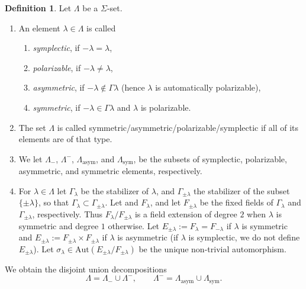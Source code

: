 \documentclass{article}
\def\tx#1{\textrm{#1}}
\theoremstyle{definition}
\newtheorem{dfn}[thm]{Definition}
\numberwithin{equation}{subsection}
\renewcommand{\-}{\hyp{}}
\begin{document}
\begin{dfn} \label{dfn:lambda_basic}
	Let $\Lambda$ be a $\Sigma$-set. 
	\begin{enumerate}
		\item An element $\lambda \in \Lambda$ is called
		\begin{enumerate}
			\item \emph{symplectic}, if $-\lambda=\lambda$,
			\item \emph{polarizable}, if $-\lambda \neq \lambda$,
			\item \emph{asymmetric}, if $-\lambda \notin \Gamma\lambda$ (hence $\lambda$ is automatically polarizable),
			\item \emph{symmetric}, if $-\lambda \in \Gamma\lambda$ and $\lambda$ is polarizable.			
		\end{enumerate}
		\item The set $\Lambda$ is called symmetric/asymmetric/polarizable/symplectic if all of its elements are of that type.
		\item We let $\Lambda_-$, $\Lambda^-$, $\Lambda_\tx{asym}$, and $\Lambda_\tx{sym}$, be the subsets of symplectic, polarizable, asymmetric, and symmetric  elements, respectively. 
		\item For $\lambda \in \Lambda$ let $\Gamma_\lambda$ be the stabilizer of $\lambda$, and $\Gamma_{\pm\lambda}$ the stabilizer of the subset $\{\pm\lambda\}$, so that $\Gamma_\lambda \subset \Gamma_{\pm\lambda}$. Let and $F_\lambda$, and let $F_{\pm\lambda}$ be the fixed fields of $\Gamma_\lambda$ and $\Gamma_{\pm\lambda}$, respectively. Thus $F_\lambda/F_{\pm\lambda}$ is a field extension of degree $2$ when $\lambda$ is symmetric and degree $1$ otherwise. Let $E_{\pm\lambda}:=F_\lambda=F_{-\lambda}$ if $\lambda$ is symmetric and $E_{\pm\lambda}:=F_{\pm\lambda} \times F_{\pm\lambda}$ if $\lambda$ is asymmetric (if $\lambda$ is symplectic, we do not define $E_{\pm\lambda}$). Let $\sigma_\lambda \in \tx{Aut}(E_{\pm\lambda}/F_{\pm\lambda})$ be the unique non-trivial automorphism.
	\end{enumerate}
\end{dfn}

We obtain the disjoint union decompositions 
\[ \Lambda = \Lambda_- \cup \Lambda^-,\qquad \Lambda^- = \Lambda_\tx{asym} \cup \Lambda_\tx{sym}. \]
\end{document}
